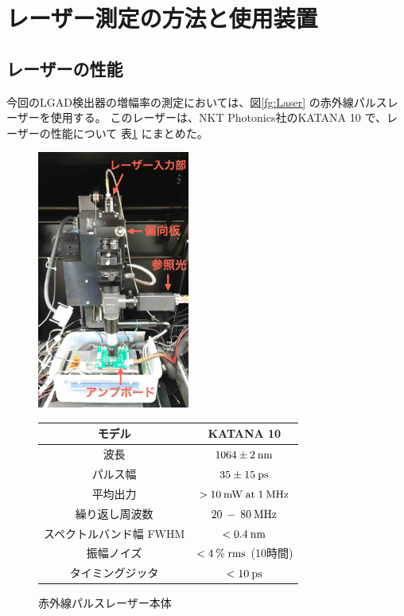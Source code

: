 \section{レーザー測定の方法と使用装置}
\subsection{レーザーの性能}
今回のLGAD検出器の増幅率の測定においては、図\ref{fg:Laser} の赤外線パルスレーザーを使用する。
このレーザーは、NKT Photonics社のKATANA 10 \cite{KATANA10}で、レーザーの性能について 表\ref{tab:Laser_performance} にまとめた。

\begin{figure}[h]
    \begin{minipage}[c]{0.45\linewidth}
        \centering
        \includegraphics[width=5cm]{fig/ch3/Laser.jpg}
        \caption{赤外線パルスレーザー本体}
        \label{fg:Laser}
    \end{minipage}
    \begin{minipage}[c]{0.45\linewidth}   %
        \def\@captype{table}
        \centering
        \begin{tabular}{cc}
            \hline
            モデル & KATANA 10  \\ \hline \hline
            波長 & $1064 \pm 2\:\rm{nm}$  \\ 
            パルス幅 & $35 \pm 15\:\rm{ps}$  \\ 
            平均出力 & $>10\:\rm{mW}\;\rm{at}\;1\:\rm{MHz}$  \\ 
            繰り返し周波数 & $20\:-\:80\:\rm{MHz}$  \\ 
            スペクトルバンド幅 FWHM & $<0.4\:\rm{nm}$  \\ 
            振幅ノイズ & $<4\:\%\;\rm{rms}$  (10時間)\\ 
            タイミングジッタ & $<10\:\rm{ps}$  \\ \hline
        \end{tabular}
        \label{tab:Laser_performance}
    \end{minipage}
\end{figure}

